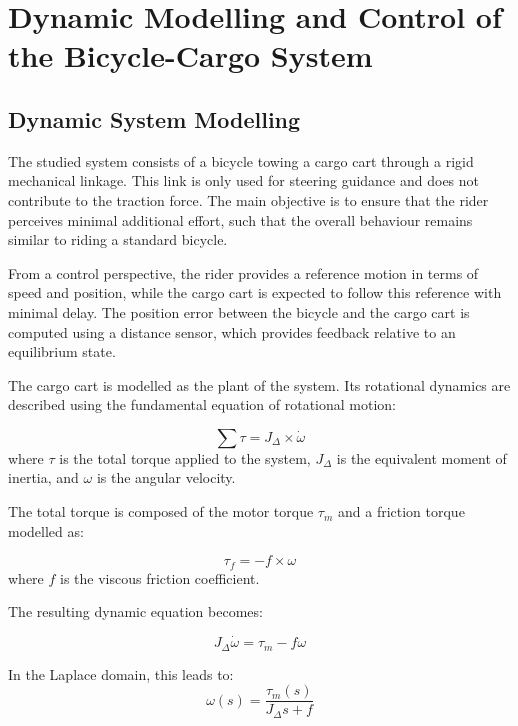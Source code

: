 \section{Dynamic Modelling and Control of the Bicycle-Cargo System}

\subsection{Dynamic System Modelling} 

The studied system consists of a bicycle towing a cargo cart through a rigid mechanical linkage. This link is only used for steering guidance and does not contribute to the traction force. The main objective is to ensure that the rider perceives minimal additional effort, such that the overall behaviour remains similar to riding a standard bicycle. 

From a control perspective, the rider provides a reference motion in terms of speed and position, while the cargo cart is expected to follow this reference with minimal delay. The position error between the bicycle and the cargo cart is computed using a distance sensor, which provides feedback relative to an equilibrium state. 

The cargo cart is modelled as the plant of the system. Its rotational dynamics are described using the fundamental equation of rotational motion: 

\begin{equation*}
\sum \tau = J_{\Delta} \times \dot{\omega} 
\end{equation*} 
where $\tau$ is the total torque applied to the system, $J_{\Delta}$ is the equivalent moment of inertia, and $\omega$ is the angular velocity. 

The total torque is composed of the motor torque $\tau_m$ and a friction torque modelled as: 

\begin{equation*} 
\tau_f = -f \times \omega 
\end{equation*} 
where $f$ is the viscous friction coefficient. 

The resulting dynamic equation becomes: 

\begin{equation*} 
J_{\Delta} \dot{\omega} = \tau_m - f \omega 
\end{equation*} 

In the Laplace domain, this leads to: 
\begin{equation*} 
\omega(s) = \frac{\tau_m(s)}{J_{\Delta} s + f} 
\end{equation*} 

